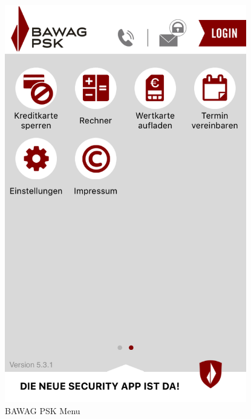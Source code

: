 \begin{figure}[H]
\begin{minipage}[b]{.5\linewidth}
        \centering\includegraphics[width=0.94\textwidth]{img/screenshots/ex1p2.png}
    \end{minipage}
	\captionsetup{labelformat=empty}
    \caption[]{BAWAG PSK Menu}
\end{figure}
